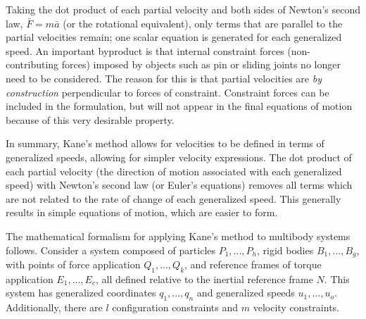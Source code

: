 \documentclass[smallcondensed,final]{svjour3}                     %
\begin{document}
Taking the dot product of each partial velocity and both sides of Newton's
second law, $\bar{F}=m\bar{a}$ (or the rotational equivalent), only terms that
are parallel to the partial velocities remain; one scalar equation is generated
for each generalized speed. An important byproduct is that internal constraint forces
(non-contributing forces) imposed by objects such as pin or sliding joints no
longer need to be considered. The reason for this is that partial velocities
are \textit{by construction} perpendicular to forces of constraint. Constraint
forces can be included in the formulation, but will not appear in the final
equations of motion because of this very desirable property.

In summary, Kane's method allows for velocities to be defined in terms of
generalized speeds, allowing for simpler velocity expressions.  The dot product
of each partial velocity (the direction of motion associated with each
generalized speed) with Newton's second law (or Euler's equations) removes all
terms which are not related to the rate of change of each generalized speed.
This generally results in simple equations of motion, which are easier to form.

The mathematical formalism for applying Kane's method to multibody systems
follows. Consider a system composed of particles $P_1,...,P_h$, rigid bodies
$B_1,...,B_g$, with points of force application $Q_1,...,Q_k$, and reference
frames of torque application $E_1,...,E_c$, all defined relative to the
inertial reference frame $N$. This system has generalized coordinates
$q_1,...,q_n$ and generalized speeds $u_1,...,u_o$. Additionally, there are $l$
configuration constraints and $m$ velocity constraints.
\end{document}
